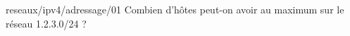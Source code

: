 
\begin{question}{reseaux/ipv4/adressage/01}
  Combien d'hôtes peut-on avoir au maximum sur le réseau 1.2.3.0/24 ?
  \begin{reponses}
    \lastchoices
  \end{reponses}
\end{question}
